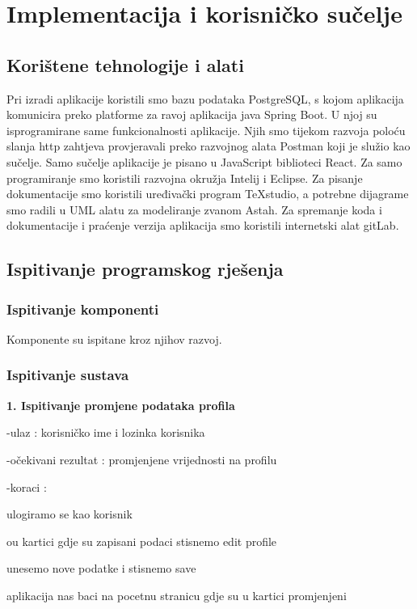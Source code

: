 \chapter{Implementacija i korisničko sučelje}
		
		
		\section{Korištene tehnologije i alati}
		
			Pri izradi aplikacije koristili smo bazu podataka PostgreSQL, s kojom aplikacija komunicira preko platforme za ravoj aplikacija java Spring Boot. U njoj su isprogramirane same funkcionalnosti aplikacije. Njih smo tijekom razvoja poloću slanja http zahtjeva provjeravali preko razvojnog alata Postman koji je služio kao sučelje.  Samo sučelje aplikacije je pisano u JavaScript biblioteci React. Za samo programiranje smo koristili razvojna okružja Intelij i Eclipse. Za pisanje dokumentacije smo koristili uređivački program TeXstudio, a potrebne dijagrame smo radili u UML alatu za modeliranje zvanom Astah. Za spremanje koda i dokumentacije i praćenje verzija aplikacija smo koristili internetski alat gitLab. 
		
	
		\section{Ispitivanje programskog rješenja}
			
			\subsection{Ispitivanje komponenti}
			
			Komponente su ispitane kroz njihov razvoj.
			
			\subsection{Ispitivanje sustava}
			
			\textbf{1. Ispitivanje promjene podataka profila}
			
			-ulaz : korisničko ime i lozinka korisnika 
			
			-očekivani rezultat : promjenjene vrijednosti na profilu
			
			-koraci : 
			
			\begin{packed_enum}
				
				\item ulogiramo se kao korisnik     
				\item ou kartici gdje su zapisani podaci stisnemo edit profile
				\item unesemo nove podatke i stisnemo save
				\item  aplikacija nas baci na pocetnu stranicu gdje su u kartici promjenjeni 
				
			\end{packed_enum}
			 
